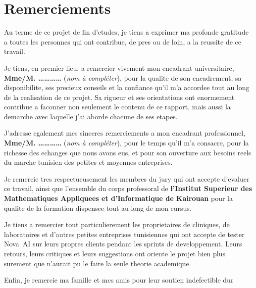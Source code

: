 \chapter*{Remerciements}

Au terme de ce projet de fin d'etudes, je tiens a exprimer ma profonde gratitude
a toutes les personnes qui ont contribue, de pres ou de loin, a la reussite de
ce travail.

Je tiens, en premier lieu, a remercier vivement mon encadrant universitaire,
\textbf{Mme/M. \dots\dots\dots\dots} (\textit{nom à compléter}), pour la qualite de son
encadrement, sa disponibilite, ses precieux conseils et la confiance qu'il
m'a accordee tout au long de la realisation de ce projet. Sa rigueur et ses
orientations ont enormement contribue a faconner non seulement le contenu de
ce rapport, mais aussi la demarche avec laquelle j'ai aborde chacune de ses
etapes.

J'adresse egalement mes sinceres remerciements a mon encadrant professionnel,
\textbf{Mme/M. \dots\dots\dots\dots} (\textit{nom à compléter}), pour le temps qu'il m'a consacre,
pour la richesse des echanges que nous avons eus, et pour son ouverture aux
besoins reels du marche tunisien des petites et moyennes entreprises.

Je remercie tres respectueusement les membres du jury qui ont accepte
d'evaluer ce travail, ainsi que l'ensemble du corps professoral de
\textbf{l'Institut Superieur des Mathematiques Appliquees et d'Informatique
de Kairouan} pour la qualite de la formation dispensee tout au long de mon
cursus.

Je tiens a remercier tout particulierement les proprietaires de cliniques,
de laboratoires et d'autres petites entreprises tunisiennes qui ont accepte
de tester Nova~AI sur leurs propres clients pendant les sprints de
developpement. Leurs retours, leurs critiques et leurs suggestions ont
oriente le projet bien plus surement que n'aurait pu le faire la seule
theorie academique.

Enfin, je remercie ma famille et mes amis pour leur soutien indefectible
dur